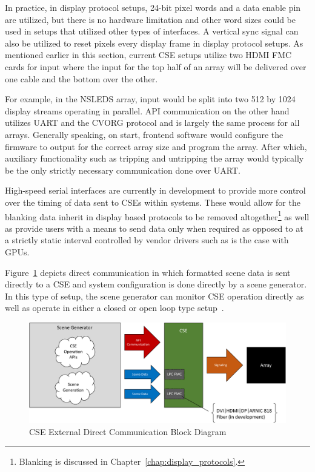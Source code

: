        In practice, in display protocol setups, 24-bit pixel words and a data enable pin are utilized, but there is no hardware limitation and other word sizes could be used in setups that utilized other types of interfaces. A vertical sync signal can also be utilized to reset pixels every display frame in display protocol setups. As mentioned earlier in this section, current CSE setups utilize two HDMI FMC cards for input where the input for the top half of an array will be delivered over one cable and the bottom over the other.

        For example, in the NSLEDS array, input would be split into two 512 by 1024 display streams operating in parallel. API communication on the other hand utilizes UART and the CVORG protocol and is largely the same process for all arrays. Generally speaking, on start, frontend software would configure the firmware to output for the correct array size and program the array. After which, auxiliary functionality such as tripping and untripping the array would typically be the only strictly necessary communication done over UART.

        High-speed serial interfaces are currently in development to provide more control over the timing of data sent to CSEs within systems. These would allow for the blanking data inherit in display based protocols to be removed altogether\footnote{Blanking is discussed in Chapter~\ref{chap:display_protocols}.} as well as provide users with a means to send data only when required as opposed to at a strictly static interval controlled by vendor drivers such as is the case with GPUs.

        Figure~\ref{fig:external_cse_comm_direct} depicts direct communication in which formatted scene data is sent directly to a CSE and system configuration is done directly by a scene generator. In this type of setup, the scene generator can monitor CSE operation directly as well as operate in either a closed or open loop type setup~\cite{NagrathGopal2009,Frank2018}.

        \begin{figure}
            \centering
            \includegraphics[width=1.0\textwidth]{fig/external_cse_comm_direct.pdf}
            \caption{CSE External Direct Communication Block Diagram}
            \label{fig:external_cse_comm_direct}
        \end{figure}

